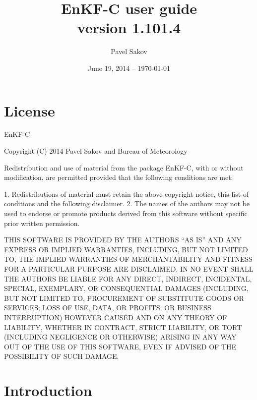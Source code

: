 \documentclass[11pt]{report}
\begin{document}
\title{EnKF-C user guide\\{\normalsize version 1.101.4}}

\author{Pavel Sakov}
\date{June 19, 2014 -- \today}

\maketitle
\thispagestyle{empty}

\clearpage

\tableofcontents

\clearpage

\chapter*{License}

EnKF-C

Copyright (C) 2014 Pavel Sakov and Bureau of Meteorology

Redistribution and use of material from the package EnKF-C, with or without
modification, are permitted provided that the following conditions are 
met:

   1. Redistributions of material must retain the above copyright notice, this
      list of conditions and the following disclaimer.
   2. The names of the authors may not be used to endorse or promote products
      derived from this software without specific prior written permission.

THIS SOFTWARE IS PROVIDED BY THE AUTHORS ``AS IS'' AND ANY EXPRESS OR IMPLIED 
WARRANTIES, INCLUDING, BUT NOT LIMITED TO, THE IMPLIED WARRANTIES OF
MERCHANTABILITY AND FITNESS FOR A PARTICULAR PURPOSE ARE DISCLAIMED. IN NO
EVENT SHALL THE AUTHORS BE LIABLE FOR ANY DIRECT, INDIRECT, INCIDENTAL, SPECIAL,
EXEMPLARY, OR CONSEQUENTIAL DAMAGES (INCLUDING, BUT NOT LIMITED TO, PROCUREMENT
OF SUBSTITUTE GOODS OR SERVICES; LOSS OF USE, DATA, OR PROFITS; OR BUSINESS
INTERRUPTION) HOWEVER CAUSED AND ON ANY THEORY OF LIABILITY, WHETHER IN
CONTRACT, STRICT LIABILITY, OR TORT (INCLUDING NEGLIGENCE OR OTHERWISE) ARISING
IN ANY WAY OUT OF THE USE OF THIS SOFTWARE, EVEN IF ADVISED OF THE POSSIBILITY
OF SUCH DAMAGE.

\chapter*{Introduction}
\end{document}
